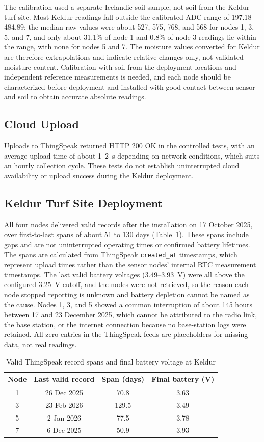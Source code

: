 The calibration used a separate Icelandic soil sample, not soil from the Keldur turf site. Most Keldur readings fall outside the calibrated ADC range of 197.18--484.89: the median raw values were about 527, 575, 768, and 568 for nodes 1, 3, 5, and 7, and only about 31.1\% of node 1 and 0.8\% of node 3 readings lie within the range, with none for nodes 5 and 7. The moisture values converted for Keldur are therefore extrapolations and indicate relative changes only, not validated moisture content. Calibration with soil from the deployment locations and independent reference measurements is needed, and each node should be characterized before deployment and installed with good contact between sensor and soil to obtain accurate absolute readings.

\subsection{Cloud Upload}
Uploads to ThingSpeak returned HTTP 200 OK in the controlled tests, with an average upload time of about 1--2~s depending on network conditions, which suits an hourly collection cycle. These tests do not establish uninterrupted cloud availability or upload success during the Keldur deployment.

\subsection{Keldur Turf Site Deployment}
All four nodes delivered valid records after the installation on 17 October 2025, over first-to-last spans of about 51 to 130 days (Table~\ref{tab:keldur}). These spans include gaps and are not uninterrupted operating times or confirmed battery lifetimes. The spans are calculated from ThingSpeak \texttt{created\_at} timestamps, which represent upload times rather than the sensor nodes' internal RTC measurement timestamps. The last valid battery voltages (3.49--3.93~V) were all above the configured 3.25~V cutoff, and the nodes were not retrieved, so the reason each node stopped reporting is unknown and battery depletion cannot be named as the cause. Nodes 1, 3, and 5 showed a common interruption of about 145 hours between 17 and 23 December 2025, which cannot be attributed to the radio link, the base station, or the internet connection because no base-station logs were retained. All-zero entries in the ThingSpeak feeds are placeholders for missing data, not real readings.

\begin{table}[!t]
\renewcommand{\arraystretch}{1.1}
\caption{Valid ThingSpeak record spans and final battery voltage at Keldur}
\label{tab:keldur}
\centering
\footnotesize
\begin{tabular}{cccc}
\toprule
Node & Last valid record & Span (days) & Final battery (V) \\
\midrule
1 & 26 Dec 2025 & 70.8 & 3.63 \\
3 & 23 Feb 2026 & 129.5 & 3.49 \\
5 & 2 Jan 2026 & 77.5 & 3.78 \\
7 & 6 Dec 2025 & 50.9 & 3.93 \\
\bottomrule
\end{tabular}
\end{table}

